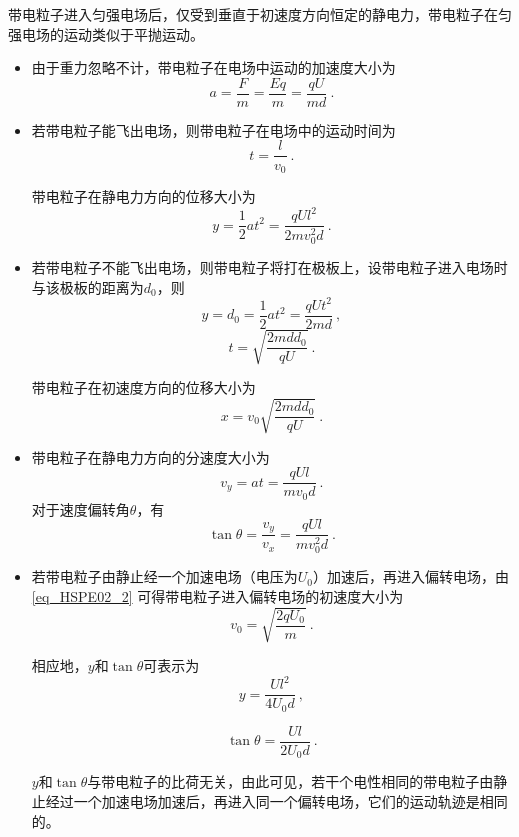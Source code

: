 带电粒子进入匀强电场后，仅受到垂直于初速度方向恒定的静电力，带电粒子在匀强电场的运动类似于平抛运动。

\begin{itemize}
\item 由于重力忽略不计，带电粒子在电场中运动的加速度大小为
\begin{equation}
a = \frac{F}{m} = \frac{Eq}{m} = \frac{qU}{md}~.
\end{equation}

\item 若带电粒子能飞出电场，则带电粒子在电场中的运动时间为
\begin{equation}
t = \frac{l}{v_0}~.
\end{equation}

带电粒子在静电力方向的位移大小为
\begin{equation}
y = \frac12 at^2 = \frac{qUl^2}{2mv_0^2 d}~.
\end{equation}

\item 若带电粒子不能飞出电场，则带电粒子将打在极板上，设带电粒子进入电场时与该极板的距离为$d_0$，则
\begin{equation}
y = d_0 = \frac12 at^2 = \frac{qUt^2}{2md}~,
\end{equation}
\begin{equation}
t = \sqrt{\frac{2mdd_0}{qU}}~.
\end{equation}

带电粒子在初速度方向的位移大小为
\begin{equation}
x = v_0\sqrt{\frac{2mdd_0}{qU}}~.
\end{equation}

\item 带电粒子在静电力方向的分速度大小为
\begin{equation}
v_y = at = \frac{qUl}{mv_0d}~.
\end{equation}
对于速度偏转角$\theta$，有
\begin{equation}
\tan \theta = \frac{v_y}{v_x} = \frac{qUl}{mv_0^2 d}~.
\end{equation}

\item 若带电粒子由静止经一个加速电场（电压为$U_0$）加速后，再进入偏转电场，由\autoref{eq_HSPE02_2} 可得带电粒子进入偏转电场的初速度大小为
\begin{equation}
v_0 = \sqrt{\frac{2qU_0}{m}}~.
\end{equation}

相应地，$y$和$\tan\theta$可表示为
\begin{equation}
y = \frac{Ul^2}{4U_0d}~,
\end{equation}

\begin{equation}
\tan\theta = \frac{Ul}{2U_0d}~.
\end{equation}

$y$和$\tan\theta$与带电粒子的比荷无关，由此可见，若干个电性相同的带电粒子由静止经过一个加速电场加速后，再进入同一个偏转电场，它们的运动轨迹是相同的。
\end{itemize}

